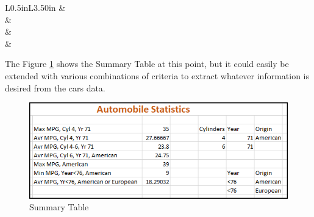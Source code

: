 \begin{enumbox}
\begin{enumerate}
\begin{table}[H]
{\begin{longtable}{L{0.5in}L{3.50in}}
					 & \\
					 & \\
					 & \\
					 & \\
					
				\end{longtable}
			} %
		\end{table}

	\end{enumerate}	
\end{enumbox}

The Figure \ref{09:fig72} shows the Summary Table at this point, but it could easily be extended with various combinations of criteria to extract whatever information is desired from the cars data. 

\begin{figure}[H]
	\centering
	\includegraphics[width=\maxwidth{.95\linewidth}]{gfx/ch09_fig72}
	\caption{Summary Table}
	\label{09:fig72}
\end{figure}


